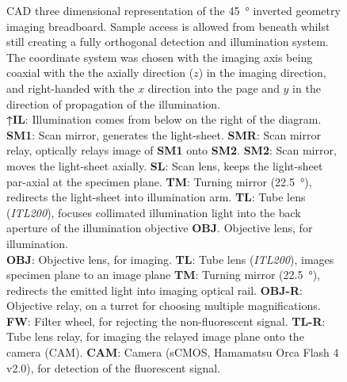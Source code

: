 \begin{figure}
        \ContinuedFloat
    \caption[\gls{CAD} three dimensional representation of the \SI{45}{\degree} inverted geometry imaging breadboard]{
    \gls{CAD} three dimensional representation of the \SI{45}{\degree} inverted geometry imaging breadboard.
    Sample access is allowed from beneath whilst still creating a fully orthogonal detection and illumination system.
    The coordinate system was chosen with the imaging axis being coaxial with the the axially direction (\(z\)) in the imaging direction, and right-handed with the \(x\) direction into the page and \(y\) in the direction of propagation of the illumination.\\
    \textcolor{illustrator_green}{\textbf{↑IL}}: Illumination comes from below on the right of the diagram.
    \textcolor{illustrator_green}{\textbf{SM1}}: Scan mirror, generates the \gls{light-sheet}.
    \textcolor{illustrator_green}{\textbf{SMR}}: Scan mirror relay, optically relays image of \textcolor{illustrator_green}{\textbf{SM1}} onto \textcolor{illustrator_green}{\textbf{SM2}}.
    \textcolor{illustrator_green}{\textbf{SM2}}: Scan mirror, moves the \gls{light-sheet} axially.
    \textcolor{illustrator_green}{\textbf{SL}}: Scan lens, keeps the \gls{light-sheet} par-axial at the specimen plane.
    \textcolor{illustrator_green}{\textbf{TM}}: Turning mirror (\SI{22.5}{\degree}), redirects the \gls{light-sheet} into \gls{illumination arm}.
    \textcolor{illustrator_green}{\textbf{TL}}: Tube lens (\emph{ITL200}), focuses collimated illumination light into the back aperture of the illumination objective \textcolor{illustrator_green}{\textbf{OBJ}}. Objective lens, for illumination.\\
    \textcolor{illustrator_red}{\textbf{OBJ}}: Objective lens, for imaging.
    \textcolor{illustrator_red}{\textbf{TL}}: Tube lens (\emph{ITL200}), images specimen plane to an image plane
    \textcolor{illustrator_red}{\textbf{TM}}: Turning mirror (\SI{22.5}{\degree}), redirects the emitted light into \gls{imaging optical rail}.
    \textcolor{illustrator_red}{\textbf{OBJ-R}}: Objective relay, on a turret for choosing multiple magnifications.
    \textcolor{illustrator_red}{\textbf{FW}}: Filter wheel, for rejecting the non-fluorescent signal.
    \textcolor{illustrator_red}{\textbf{TL-R}}: Tube lens relay, for imaging the relayed image plane onto the camera (CAM).
    \textcolor{illustrator_red}{\textbf{CAM}}: Camera (sCMOS, Hamamatsu Orca Flash 4 v2.0), for detection of the fluorescent signal.
    }\label{fig:soldiworks_top}


\end{figure}
